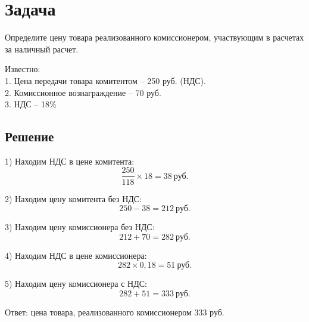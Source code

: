 \section{Задача}
Определите цену товара реализованного комиссионером,
участвующим в расчетах за наличный расчет.

Известно:\\
1. Цена передачи товара комитентом – 250 руб. (НДС).\\
2. Комиссионное вознаграждение – 70 руб.\\
3. НДС – 18\%

\subsection*{Решение}
1) Находим НДС в цене комитента:
\[ \dfrac{250}{118} \times 18 = 38\  \text{руб.}\] 

2) Находим цену комитента без НДС:
\[ 250 - 38 = 212 \  \text{руб.} \]

3) Находим цену комиссионера без НДС:
\[ 212 + 70 = 282\  \text{руб.} \]

4) Находим НДС в цене комиссионера:
\[ 282 \times 0,18 = 51 \  \text{руб.}  \]

5) Находим цену комиссионера с НДС:
\[ 282 + 51 = 333\  \text{руб.} \]

Ответ: цена товара, реализованного комиссионером 333 руб.